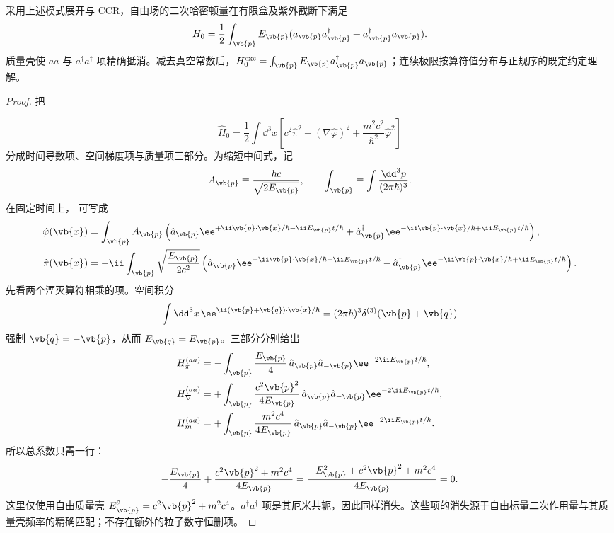 \begin{proposition}[自由实标量哈密顿量的模式对角化]
采用上述模式展开与 CCR，自由场的二次哈密顿量在有限盒及紫外截断下满足
\[
H_0=\frac12\int_{\vb{p}}E_{\vb{p}}(a_{\vb{p}}a_{\vb{p}}^\dagger+a_{\vb{p}}^\dagger a_{\vb{p}}).
\]
质量壳使 $aa$ 与 $a^\dagger a^\dagger$ 项精确抵消。减去真空常数后，$H_0^{\rm exc}=\int_{\vb{p}}E_{\vb{p}}a_{\vb{p}}^\dagger a_{\vb{p}}$；连续极限按算符值分布与正规序的既定约定理解。
\end{proposition}
\begin{proof}
把

\begin{equation*}
 \hat H_0=\frac12\int\dd^3 x\left[
 c^2\hat\pi^2+(\nabla\hat\varphi)^2
 +\frac{m^2c^2}{\hbar^2}\hat\varphi^2
 \right]
 \end{equation*}
分成时间导数项、空间梯度项与质量项三部分。为缩短中间式，记
\begin{equation*}
 A_{\vb{p}}\equiv\frac{\hbar c}{\sqrt{2E_{\vb{p}}}},
 \qquad \int_{\vb{p}}\equiv\int\frac{\dd^3 p}{(2\pi\hbar)^3}.
\end{equation*}
在固定时间上， 可写成
\begin{align*}
 \hat\varphi(\vb{x})
 &=\int_{\vb{p}}A_{\vb{p}}
 \left(\hat a_{\vb{p}}\ee^{+\ii\vb{p}\cdot\vb{x}/\hbar-\ii E_{\vb{p}}t/\hbar}
 +\hat a_{\vb{p}}^\dagger \ee^{-\ii\vb{p}\cdot\vb{x}/\hbar+\ii E_{\vb{p}}t/\hbar}\right),\\
 \hat\pi(\vb{x})
 &=-\ii\int_{\vb{p}}\sqrt{\frac{E_{\vb{p}}}{2c^2}}
 \left(\hat a_{\vb{p}}\ee^{+\ii\vb{p}\cdot\vb{x}/\hbar-\ii E_{\vb{p}}t/\hbar}
 -\hat a_{\vb{p}}^\dagger \ee^{-\ii\vb{p}\cdot\vb{x}/\hbar+\ii E_{\vb{p}}t/\hbar}\right).
 \end{align*}
先看两个湮灭算符相乘的项。空间积分
\begin{equation*}
 \int\dd^3 x\,
 \ee^{\ii(\vb{p}+\vb{q})\cdot\vb{x}/\hbar}
 =(2\pi\hbar)^3\delta^{(3)}(\vb{p}+\vb{q})
 \end{equation*}
强制 $\vb{q}=-\vb{p}$，从而 $E_{\vb{q}}=E_{\vb{p}}$。三部分分别给出
\begin{align*}
 H_{\pi}^{(aa)}
 &=-\int_{\vb{p}}\frac{E_{\vb{p}}}{4}\,
 \hat a_{\vb{p}}\hat a_{-\vb{p}}
 \ee^{-2\ii E_{\vb{p}}t/\hbar},\\
 H_{\nabla}^{(aa)}
 &=+\int_{\vb{p}}\frac{c^2\vb{p}^2}{4E_{\vb{p}}}\,
 \hat a_{\vb{p}}\hat a_{-\vb{p}}
 \ee^{-2\ii E_{\vb{p}}t/\hbar},\\
 H_{m}^{(aa)}
 &=+\int_{\vb{p}}\frac{m^2c^4}{4E_{\vb{p}}}\,
 \hat a_{\vb{p}}\hat a_{-\vb{p}}
 \ee^{-2\ii E_{\vb{p}}t/\hbar}.
 \end{align*}
所以总系数只需一行：
\begin{equation*}
 -\frac{E_{\vb{p}}}4+\frac{c^2\vb{p}^2+m^2c^4}{4E_{\vb{p}}}
 =\frac{-E_{\vb{p}}^2+c^2\vb{p}^2+m^2c^4}{4E_{\vb{p}}}=0.
\end{equation*}
这里仅使用自由质量壳 $E_{\vb{p}}^2=c^2\vb{p}^2+m^2c^4$。$a^\dagger a^\dagger$ 项是其厄米共轭，因此同样消失。这些项的消失源于自由标量二次作用量与其质量壳频率的精确匹配；不存在额外的粒子数守恒删项。


\end{proof}
